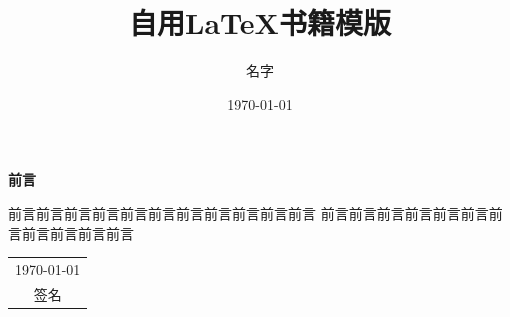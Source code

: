 \title{自用\rm{\LaTeX}书籍模版}
\author{名字}
\date{\today}
\thispagestyle{empty}
\maketitle

\thispagestyle{empty}
\begin{center}\Huge\textbf{前言}\end{center}
前言前言前言前言前言前言前言前言前言前言前言
前言前言前言前言前言前言前言前言前言前言前言
\begin{flushright}
    \begin{tabular}{c}
        \today \\ 签名
    \end{tabular}
\end{flushright}

\newpage
\setcounter{page}{1}
\pagestyle{plain}
\tableofcontents

\newpage
\pagestyle{plain}
\setcounter{page}{1}
